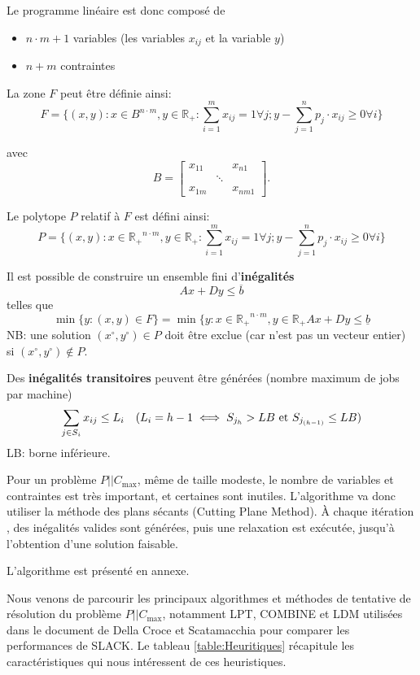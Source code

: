 \documentclass[a4paper,12pt]{report}
\theoremstyle{plain}				%
\theoremstyle{definition}				%
\newcommand\problemGrahamP{$P||C_{\max}$\xspace}
\begin{document}
Le programme linéaire est donc composé de
\begin{itemize}
\item $n \cdot m + 1$ variables (les variables $x_{ij}$ et la variable $y$)
\item $n+m$ contraintes
\end{itemize}

La zone $F$ peut être définie ainsi:
\[
  F=\{ (x,y) : x \in B^{n \cdot m}, y \in \mathbb{R_+} : \sum_{i=1}^{m} x_{ij}=1 \forall j;
y-\sum_{j=1}^{n} p_j \cdot x_{ij} \geq 0 \forall i \}
\]

avec
\[
B=\begin{bmatrix}
x_{11}& &x_{n1}\\
& \ddots & \\
x_{1m}& &x_{nm1}
\end{bmatrix}.
\]

Le polytope $P$ relatif à $F$ est défini ainsi:
\[
  P=\{ (x,y) : x \in \mathbb{R_+}^{n \cdot m}, y \in \mathbb{R_+} : \sum_{i=1}^{m} x_{ij}=1 \forall j;
  y-\sum_{j=1}^{n} p_j \cdot x_{ij} \geq 0 \forall i	\}
\]

Il est possible de construire un ensemble fini d'\textbf{inégalités}
\[
  Ax+Dy \leq \overline{b}
\]
telles que
\[
  \min \{y : (x,y) \in F \} = \min \{y : x \in \mathbb{R_+}^{n \cdot m}, y \in \mathbb{R_+} Ax+Dy \leq \underline{b}
\]
NB: une solution
$(x \ensuremath{^\circ} , y\ensuremath{^\circ}) \in P$ doit être
exclue (car n'est pas un vecteur entier) si
$(x\ensuremath{^\circ}, y\ensuremath{^\circ}) \notin P $.

\bigskip

Des \textbf{inégalités transitoires} peuvent être générées (nombre
maximum de jobs par machine)
\[
  \sum_{j \in S_i} x_{ij} \leq L_i \quad (L_i = h-1 \iff S_{j_h} > LB
  \textnormal{ et } S_{j_{(h-1)}} \leq LB)
\]
LB: borne inférieure.

\bigskip

Pour un problème \problemGrahamP, même de taille modeste, le nombre de
variables et contraintes est très important, et certaines sont
inutiles.
L'algorithme va donc utiliser la méthode des plans sécants (Cutting
Plane Method).
\`A chaque itération , des inégalités valides sont générées, puis une
relaxation est exécutée, jusqu'à l'obtention d'une solution faisable.

L'algorithme est présenté en annexe.

\bigskip
Nous venons de parcourir les principaux algorithmes et méthodes de tentative de résolution du problème \problemGrahamP, 
  notamment LPT, COMBINE et LDM 
  utilisées dans le document de Della Croce et Scatamacchia \cite{della2020longest} 
  pour comparer les performances de SLACK. 
Le tableau \ref{table:Heuritiques} récapitule les caractéristiques qui nous intéressent 
  de ces heuristiques.
\end{document}
